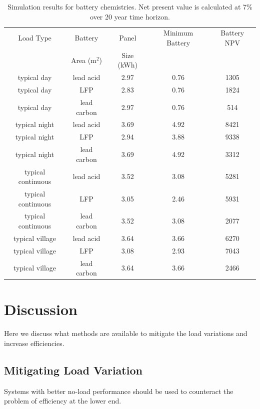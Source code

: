 \documentclass[conference]{IEEEtran}
\begin{document}
\begin{table}[!t]
\centering
\begin{tabular}{ c  c
                 c 
                 c c}
Load Type & Battery & Panel          & Minimum Battery & Battery NPV\\
                    & Area (m$^2$)   & Size (kWh)      \\
\hline
typical day & lead acid          & 2.97 & 0.76 & 1305 \\
typical day & LFP                & 2.83 & 0.76 & 1824 \\
typical day & lead carbon        & 2.97 & 0.76 & 514 \\

typical night & lead acid        & 3.69 & 4.92 & 8421 \\
typical night & LFP              & 2.94 & 3.88 & 9338 \\
typical night & lead carbon      & 3.69 & 4.92 & 3312 \\

typical continuous & lead acid   & 3.52 & 3.08 & 5281 \\
typical continuous & LFP         & 3.05 & 2.46 & 5931 \\
typical continuous & lead carbon & 3.52 & 3.08 & 2077 \\

typical village & lead acid      & 3.64 & 3.66 & 6270 \\
typical village & LFP            & 3.08 & 2.93 & 7043 \\
typical village & lead carbon    & 3.64 & 3.66 & 2466 \\
\end{tabular}
\caption{Simulation results for battery chemistries.
Net present value is calculated at 7\% over 20 year 
time horizon.}
\label{table_battery}
\end{table}


\section{Discussion}
Here we discuss what methods are available to mitigate the
load variations and increase efficiencies.

\subsection{Mitigating Load Variation}
Systems with better no-load performance should be used to counteract
the problem of efficiency at the lower end.
\end{document}
